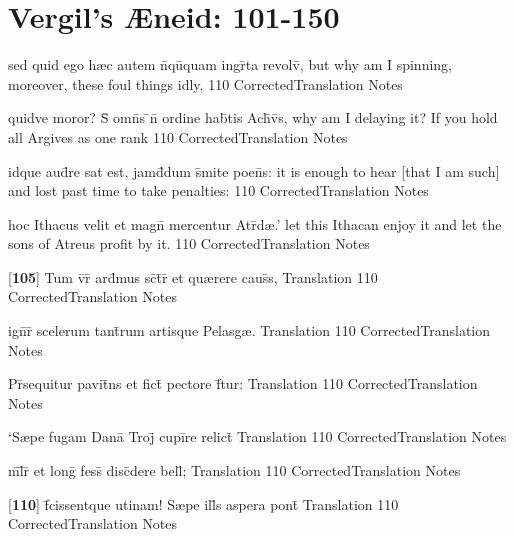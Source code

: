 \section{Vergil's {\AE}neid: 101-150} %

\latline
  {sed quid ego h{\ae}c autem n\={}qu\={\macron {\i}}quam ingr\={}ta revolv\={},}
  { but why am I spinning, moreover, these foul things idly, }
  {110}
  { CorrectedTranslation }
  { Notes }


\latline
  {quidve moror?  S\={\macron {\i}} omn\={\macron {\i}}s \={}n\={} ordine hab\={}tis Ach\={\macron {\i}}v\={}s,}
  { why am I delaying it?  If you hold all Argives as one rank }
  {110}
  { CorrectedTranslation }
  { Notes }


\latline
  {idque aud\={\macron {\i}}re sat est, jamd\={}dum s\={}mite poen\={}s:}
  { it is enough to hear [that I am such] and lost past time to take penalties: }
  {110}
  { CorrectedTranslation }
  { Notes }


\latline
  {hoc Ithacus velit et magn\={} mercentur Atr\={\macron {\i}}d{\ae}.'}
  { let this Ithacan enjoy it and let the sons of Atreus profit by it. }
  {110}
  { CorrectedTranslation }
  { Notes }


\latline
  {[\textbf{105}] Tum v\={}r\={} ard\={}mus sc\={\macron {\i}}t\={}r\={\macron {\i}} et qu{\ae}rere caus\={}s,}
  { Translation }
  {110}
  { CorrectedTranslation }
  { Notes }


\latline
  {ign\={}r\={\macron {\i}} scelerum tant\={}rum artisque Pelasg{\ae}.}
  { Translation }
  {110}
  { CorrectedTranslation }
  { Notes }


\latline
  {Pr\={}sequitur pavit\={}ns et fict\={} pectore f\={}tur:}
  { Translation }
  {110}
  { CorrectedTranslation }
  { Notes }


\latline
  {`S{\ae}pe fugam Dana\={\macron {\i}} Troj\={} cupi\={}re relict\={}}
  { Translation }
  {110}
  { CorrectedTranslation }
  { Notes }


\latline
  {m\={}l\={\macron {\i}}r\={\macron {\i}} et long\={} fess\={\macron {\i}} disc\={}dere bell\={};}
  { Translation }
  {110}
  { CorrectedTranslation }
  { Notes }


\latline
  {[\textbf{110}] f\={}cissentque utinam!  S{\ae}pe ill\={}s aspera pont\={\macron {\i}}}
  { Translation }
  {110}
  { CorrectedTranslation }
  { Notes }


